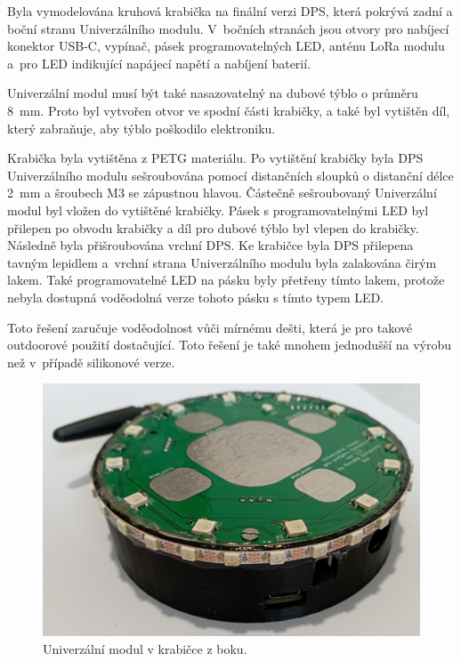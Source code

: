 Byla vymodelována kruhová krabička na finální verzi DPS, která pokrývá zadní a boční stranu Univerzálního modulu. V~bočních stranách jsou otvory pro nabíjecí konektor USB-C, vypínač, pásek programovatelných 
LED, anténu LoRa modulu a~pro LED indikující napájecí napětí a nabíjení baterií. 

Univerzální modul musí být také nasazovatelný na dubové týblo o průměru 8~mm. Proto byl vytvořen otvor ve spodní části krabičky, a také byl 
vytištěn díl, který zabraňuje, aby týblo poškodilo elektroniku. 

Krabička byla vytištěna z PETG materiálu. Po vytištění krabičky byla DPS Univerzálního modulu sešroubována pomocí distančních sloupků o distanční délce 2~mm a šroubech M3 se zápustnou hlavou. Částečně sešroubovaný Univerzální 
modul byl vložen do vytištěné krabičky. Pásek s programovatelnými LED byl přilepen po obvodu krabičky a díl pro dubové týblo byl vlepen do krabičky. Následně byla přišroubována vrchní DPS. Ke krabičce byla DPS přilepena tavným 
lepidlem a~vrchní strana Univerzálního modulu byla zalakována čirým lakem. 
Také programovatelné LED na pásku byly přetřeny tímto lakem, protože nebyla dostupná voděodolná verze tohoto pásku s tímto typem LED. 

Toto řešení zaručuje voděodolnost vůči mírnému dešti, která je pro takové outdoorové použití dostačující. Toto řešení je také mnohem jednodušší na výrobu než v~případě silikonové verze. 

\begin{figure}[!h]
  \begin{center}
    \includegraphics[scale=0.16]{obrazky/v_krabicce_bok.jpg}
  \end{center}
  \caption[Univerzální modul v krabičce z boku]{Univerzální modul v krabičce z boku.}
\end{figure}





